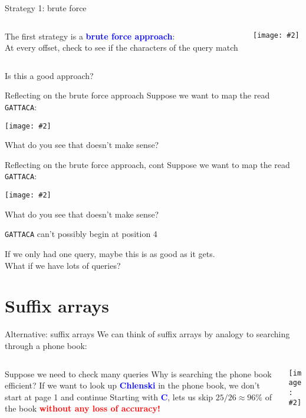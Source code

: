 \documentclass{beamer}
\renewcommand{\c}[1]{\begin{center}#1\end{center}}
\newcommand{\blu}[1]{\textcolor{blue}{\textbf{#1}}}
\newcommand{\red}[1]{\textcolor{red}{\textbf{#1}}}
\newcommand{\gr}[2][.95]{\c{\texttt{[image: \#2]}}}
\begin{document}
\begin{frame}{Strategy 1: brute force}
    \begin{columns}
        \begin{column}{0.5\textwidth}
            The first strategy is a \blu{brute force approach}:\\ 
            \bigskip
            At every offset, check to see if the characters of the query match
        \end{column}
        \begin{column}{0.5\textwidth}
            \gr{l6_figs/s3_snps.png}
        \end{column}
    \end{columns}
    \bigskip \centering
    Is this a good approach?
\end{frame}

\begin{frame}{Reflecting on the brute force approach}
    Suppose we want to map the read \texttt{GATTACA}:
    \gr{l6_figs/s5_read_mapping.png}
    What do you see that doesn't make sense?
\end{frame}

\begin{frame}{Reflecting on the brute force approach, cont}
    Suppose we want to map the read \texttt{GATTACA}:
    \gr{l6_figs/s5_read_mapping.png}
    What do you see that doesn't make sense?
    \begin{outline}
        \1 \texttt{GATTACA} can't possibly begin at position 4
    \end{outline}
    If we only had one query, maybe this is as good as it gets.\\
    \bigskip
    What if we have lots of queries?
\end{frame}

\section{Suffix arrays}

\begin{frame}{Alternative: suffix arrays}
    We can think of suffix arrays by analogy to searching through a phone book:
    \begin{columns}
        \begin{column}{0.5\textwidth}
            \begin{outline}
                \1 Suppose we need to check many queries
                \1 Why is searching the phone book efficient?
                    \2 If we want to look up \blu{Chlenski} in the phone book, we don't start at page 1 and continue
                    \2 Starting with \blu{C}, lets us skip $25/26 \approx 96\%$ of the book \red{without any loss of accuracy!}
            \end{outline} 
        \end{column}
        \begin{column}{0.5\textwidth}
            \gr{l6_figs/s6_suffix_arrays.png}
        \end{column}
    \end{columns}
\end{frame}
\end{document}
